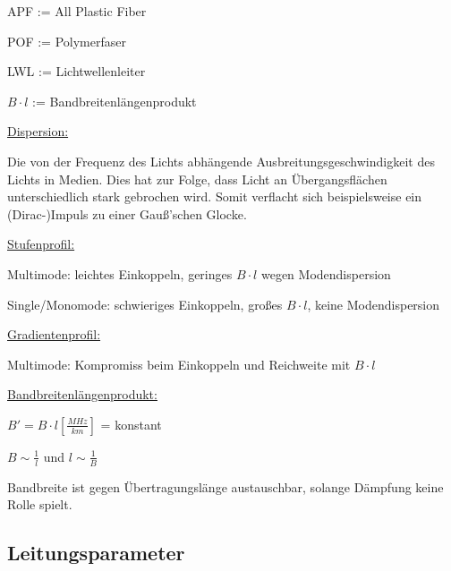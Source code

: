 \begin{description}
    \setlength\itemsep{1pt}
    \item APF := All Plastic Fiber
    \item POF := Polymerfaser
    \item LWL := Lichtwellenleiter
    \item $B\cdot l$ := Bandbreitenlängenprodukt
\end{description}

\begin{description}
    \item \underline{Dispersion:}

          {\small Die von der Frequenz des Lichts abhängende
              Ausbreitungsgeschwindigkeit des Lichts in Medien. Dies hat zur Folge,
              dass Licht an Übergangsflächen unterschiedlich stark gebrochen wird.
              Somit verflacht sich beispielsweise ein (Dirac-)Impuls zu einer Gauß'schen
              Glocke.
          }
    \item \underline{Stufenprofil:}

          {\small Multimode: leichtes Einkoppeln, geringes $B\cdot l$ wegen
              Modendispersion

              Single/Monomode: schwieriges Einkoppeln, großes $B\cdot l$, keine
              Modendispersion
          }
    \item \underline{Gradientenprofil:}

          {\small Multimode: Kompromiss beim Einkoppeln und Reichweite mit $B\cdot l$}
    \item \underline{Bandbreitenlängenprodukt:}

          {\small $B' =  B\cdot l[\frac{MHz}{km}]$ = konstant

              $B \sim \frac{1}{l}$ und $l\sim \frac{1}{B}$

              Bandbreite ist gegen Übertragungslänge austauschbar, solange
              Dämpfung keine Rolle spielt.
          }
\end{description}
\newpage
\subsection{Leitungsparameter}
